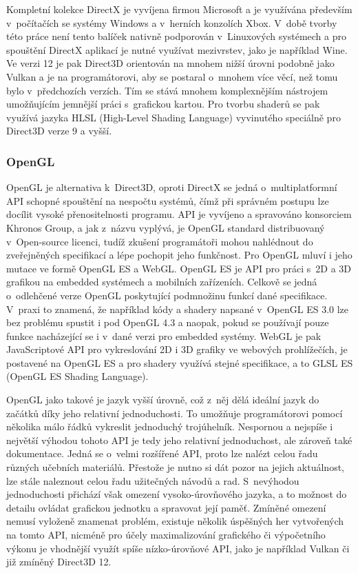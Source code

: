 Kompletní kolekce DirectX je vyvíjena firmou Microsoft a je využívána především v~počítačích se systémy Windows a v~herních konzolích Xbox. V~době tvorby této práce není tento balíček nativně podporován v~Linuxových systémech a pro spouštění DirectX aplikací je nutné využívat mezivrstev, jako je například Wine. Ve verzi 12 je pak Direct3D orientován na mnohem nižší úrovni podobně jako Vulkan a je na programátorovi, aby se postaral o~mnohem více věcí, než tomu bylo v~předchozích verzích. Tím se stává mnohem komplexnějším nástrojem umožňujícím jemnější práci s~grafickou kartou. Pro tvorbu shaderů se pak využívá jazyka HLSL (High-Level Shading Language) vyvinutého speciálně pro Direct3D verze 9 a vyšší. \cite{parrish_2016} \cite{grantmestrength}
\subsubsection{OpenGL}
OpenGL je alternativa k~Direct3D, oproti DirectX se jedná o~multiplatformní API schopné spouštění na nespočtu systémů, čímž při správném postupu lze docílit vysoké přenositelnosti programu. API je vyvíjeno a spravováno konsorciem Khronos Group, a jak z~názvu vyplývá, je OpenGL standard distribuovaný v~Open-source licenci, tudíž zkušení programátoři mohou nahlédnout do zveřejněných specifikací a lépe pochopit jeho funkčnost. Pro OpenGL mluví i jeho mutace ve formě OpenGL ES a WebGL. OpenGL ES je API pro práci s~2D a 3D grafikou na embedded systémech a mobilních zařízeních. Celkově se jedná o~odlehčené verze OpenGL poskytující podmnožinu funkcí dané specifikace. V~praxi to znamená, že například kódy a shadery napsané v~OpenGL ES 3.0 lze bez problému spustit i pod OpenGL 4.3 a naopak, pokud se používají pouze funkce nacházející se i v~dané verzi pro embedded systémy. WebGL je pak JavaScriptové API pro vykreslování 2D i 3D grafiky ve webových prohlížečích, je postavené na OpenGL ES a pro shadery využívá stejné specifikace, a to GLSL ES (OpenGL ES Shading Language). \cite{opengl} \cite{webgl} \cite{group}

OpenGL jako takové je jazyk vyšší úrovně, což z~něj dělá ideální jazyk do začátků díky jeho relativní jednoduchosti. To umožňuje programátorovi pomocí několika málo řádků vykreslit jednoduchý trojúhelník. Nespornou a nejspíše i největší výhodou tohoto API je tedy jeho relativní jednoduchost, ale zároveň také dokumentace. Jedná se o~velmi rozšířené API, proto lze nalézt celou řadu různých učebních materiálů. Přestože je nutno si dát pozor na jejich aktuálnost, lze stále naleznout celou řadu užitečných návodů a rad. S~nevýhodou jednoduchosti přichází však omezení vysoko-úrovňového jazyka, a to možnost do detailu ovládat grafickou jednotku a spravovat její paměť. Zmíněné omezení nemusí vyloženě znamenat problém, existuje několik úspěšných her vytvořených na tomto API, nicméně pro účely maximalizování grafického či výpočetního výkonu je vhodnější využít spíše nízko-úrovňové API, jako je například Vulkan či již zmíněný Direct3D 12.


